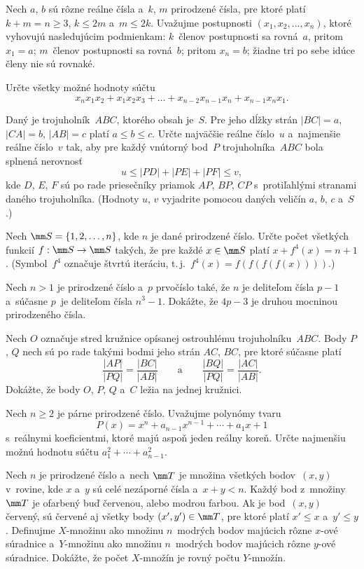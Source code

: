 {%
Nech $a$, $b$ sú rôzne reálne čísla a~$k$, $m$
prirodzené čísla, pre ktoré platí $k+m=n\geq 3$, $k\leq 2m$ a~$m\leq
2k$. Uvažujme postupnosti $(x_1,x_2,\dots ,x_n)$, ktoré vyhovujú
nasledujúcim podmienkam:
\ite{} $k$~členov postupnosti sa rovná~$a$, pritom $x_1=a$;
\ite{} $m$~členov postupnosti sa rovná~$b$; pritom $x_n=b$;
\ite{} žiadne tri po sebe idúce členy nie sú rovnaké.

\noindent
Určte všetky možné hodnoty súčtu
$$
x_nx_1x_2+x_1x_2x_3+\dots +x_{n-2}x_{n-1}x_n+x_{n-1}x_nx_1.
$$}

{%
Daný je trojuholník~$ABC$, ktorého obsah je~$S$. Pre jeho dĺžky
strán $|BC|=a$, $|CA|=b$, $|AB|=c$ platí $a\leq b\leq c$. Určte
najväčšie reálne číslo~$u$ a~najmenšie reálne číslo~$v$ tak, aby
pre každý vnútorný bod~$P$ trojuholníka~$ABC$ bola splnená
nerovnosť
$$
u\leq |PD|+|PE|+|PF|\leq v,
$$
kde $D$, $E$, $F$ sú po rade priesečníky priamok $AP$, $BP$, $CP$
s~protiľahlými stranami daného trojuholníka.
(Hodnoty $u$, $v$ vyjadrite pomocou daných veličín $a$, $b$, $c$
a~$S$.)}

{%
Nech $\mm S=\{1,2,\dots,n\}$, kde $n$ je dané prirodzené číslo.
Určte počet všetkých funkcií $f:\mm S\to\mm S$ takých, že pre každé
$x\in\mm S$ platí $x+f^4(x)=n+1$.
(Symbol~$f^4$ označuje štvrtú iteráciu, t.\,j.~$f^4(x)=f(f(f(f(x))))$.)}

{%
Nech $n>1$ je prirodzené číslo a~$p$ prvočíslo také, že $n$ je
deliteľom čísla $p-1$ a~súčasne $p$~je deliteľom čísla $n^3-1$.
Dokážte, že $4p-3$ je druhou mocninou prirodzeného čísla.}

{%
Nech $O$ označuje stred kružnice opísanej ostrouhlému trojuholníku~$ABC$.
Body $P$, $Q$ nech sú po rade takými bodmi jeho strán
$AC$, $BC$, pre ktoré súčasne platí
$$
\frac{|AP|}{|PQ|}=\frac{|BC|}{|AB|} \qquad \text{a} \qquad
      \frac{|BQ|}{|PQ|}=\frac{|AC|}{|AB|}.
$$
Dokážte, že body $O$, $P$, $Q$ a~$C$ ležia na jednej kružnici.}

{%
Nech $n\geq 2$ je párne prirodzené číslo. Uvažujme polynómy tvaru
$$
P(x)=x^n+a_{n-1}x^{n-1}+\cdots +a_1x+1
$$
s~reálnymi koeficientmi, ktoré majú aspoň jeden reálny koreň.
Určte najmenšiu možnú hodnotu súčtu $a_1^2+\cdots +a_{n-1}^2$.}

{%
Nech $n$ je prirodzené číslo a~nech $\mm T$ je množina všetkých bodov~$(x,y)$
v~rovine, kde $x$ a~$y$ sú celé nezáporné čísla
a~$x+y<n$. Každý bod z~množiny~$\mm T$ je ofarbený buď červenou, alebo
modrou farbou. Ak je bod~$(x,y)$ červený, sú červené aj všetky body
$(x',y')\in\mm T$, pre ktoré platí $x'\leq x$ a~$y'\leq y$.
Definujme $X$-množinu ako množinu $n$~modrých bodov majúcich
rôzne $x$-ové súradnice a~$Y$-množinu ako množinu $n$~modrých
bodov majúcich rôzne $y$-ové súradnice. Dokážte, že počet
$X$-množín je rovný počtu $Y$-množín.}

